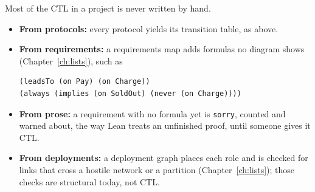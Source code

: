 Most of the CTL in a project is never written by hand.
\begin{itemize}
\item \textbf{From protocols:} every protocol yields its transition table, as above.
\item \textbf{From requirements:} a requirements map adds formulas no diagram shows
  (Chapter~\ref{ch:lists}), such as
\begin{lstlisting}[language={},basicstyle=\ttfamily\footnotesize]
(leadsTo (on Pay) (on Charge))
(always (implies (on SoldOut) (never (on Charge))))
\end{lstlisting}
\item \textbf{From prose:} a requirement with no formula yet is \texttt{sorry}, counted and
  warned about, the way Lean treats an unfinished proof, until someone gives it CTL.
\item \textbf{From deployments:} a deployment graph places each role and is checked for
  links that cross a hostile network or a partition (Chapter~\ref{ch:lists}); those checks
  are structural today, not CTL.
\end{itemize}
